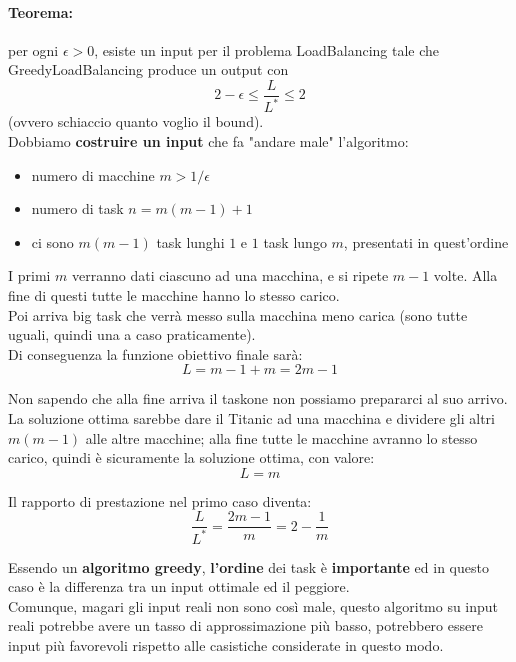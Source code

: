 \paragraph{Teorema:} per ogni $\epsilon > 0$, esiste un input per il problema LoadBalancing tale che GreedyLoadBalancing produce un output con 
$$ 2 - \epsilon \leq \frac{L}{L^\ast} \leq 2$$
(ovvero schiaccio quanto voglio il bound).\\

Dobbiamo \textbf{costruire un input} che fa "andare male" l'algoritmo:
\begin{itemize}
	\item numero di macchine $m > 1/ \epsilon$
	\item numero di task $n = m(m-1)+1$
	\item ci sono $m(m-1)$ task lunghi $1$ e $1$ task lungo $m$, presentati in quest'ordine
\end{itemize}

I primi $m$ verranno dati ciascuno ad una macchina, e si ripete $m-1$ volte. Alla fine di questi tutte le macchine hanno lo stesso carico.\\
Poi arriva big task che verrà messo sulla macchina meno carica (sono tutte uguali, quindi una a caso praticamente).\\

Di conseguenza la funzione obiettivo finale sarà:
$$ L = m - 1 + m = 2m - 1 $$

Non sapendo che alla fine arriva il taskone non possiamo prepararci al suo arrivo. La soluzione ottima sarebbe dare il Titanic ad una macchina e dividere gli altri $m(m-1)$ alle altre macchine; alla fine tutte le macchine avranno lo stesso carico, quindi è sicuramente la soluzione ottima, con valore:
$$ L = m $$

Il rapporto di prestazione nel primo caso diventa:
$$ \frac{L}{L^\ast} = \frac{2m-1}{m} = 2 - \frac{1}{m} $$

Essendo un \textbf{algoritmo greedy}, \textbf{l'ordine} dei task è \textbf{importante} ed in questo caso è la differenza tra un input ottimale ed il peggiore.\\

Comunque, magari gli input reali non sono così male, questo algoritmo su input reali potrebbe avere un tasso di approssimazione più basso, potrebbero essere input più favorevoli rispetto alle casistiche considerate in questo modo.\\

